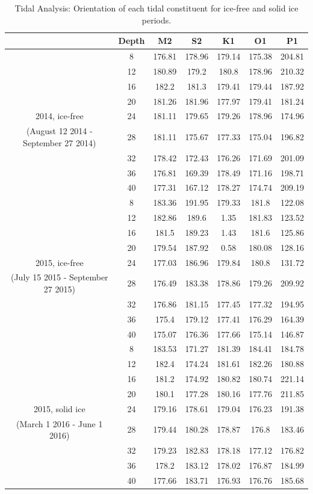 \documentclass[12pt]{dforeport}
\begin{document}
\begin{table}[ht]
\centering
\caption[Orientation of Tidal Constituents]{Tidal Analysis: Orientation of each tidal constituent for ice-free and solid ice periods.} 
\label{t:orien}
\begin{tabular}{| c | c | c c c c c |}
\hline
& Depth & M2 & S2 & K1 & O1 & P1 \\
\hline
& 8 & 176.81 & 178.96 & 179.14 & 175.38 & 204.81 \\
& 12 & 180.89 & 179.2 & 180.8 & 178.96 & 210.32 \\
& 16 & 182.2 & 181.3 & 179.41 & 179.44 & 187.92 \\
& 20 & 181.26 & 181.96 & 177.97 & 179.41 & 181.24 \\
2014, ice-free & 24 & 181.11 & 179.65 & 179.26 & 178.96 & 174.96 \\
(August 12 2014 - September 27 2014) & 28 & 181.11 & 175.67 & 177.33 & 175.04 & 196.82 \\
& 32 & 178.42 & 172.43 & 176.26 & 171.69 & 201.09 \\
& 36 & 176.81 & 169.39 & 178.49 & 171.16 & 198.71 \\
& 40 & 177.31 & 167.12 & 178.27 & 174.74 & 209.19 \\
 \hline
& 8 & 183.36 & 191.95 & 179.33 & 181.8 & 122.08 \\
& 12 & 182.86 & 189.6 & 1.35 & 181.83 & 123.52 \\
& 16 & 181.5 & 189.23 & 1.43 & 181.6 & 125.86 \\
& 20 & 179.54 & 187.92 & 0.58 & 180.08 & 128.16 \\
2015, ice-free & 24 & 177.03 & 186.96 & 179.84 & 180.8 & 131.72 \\
(July 15 2015 - September 27 2015) & 28 & 176.49 & 183.38 & 178.86 & 179.26 & 209.92 \\
& 32 & 176.86 & 181.15 & 177.45 & 177.32 & 194.95 \\
& 36 & 175.4 & 179.12 & 177.41 & 176.29 & 164.39 \\
& 40 & 175.07 & 176.36 & 177.66 & 175.14 & 146.87 \\
 \hline
& 8 & 183.53 & 171.27 & 181.39 & 184.41 & 184.78 \\
& 12 & 182.4 & 174.24 & 181.61 & 182.26 & 180.88 \\
& 16 & 181.2 & 174.92 & 180.82 & 180.74 & 221.14 \\
& 20 & 180.1 & 177.28 & 180.16 & 177.76 & 211.85 \\
2015, solid ice & 24 & 179.16 & 178.61 & 179.04 & 176.23 & 191.38 \\
(March 1 2016 - June 1 2016) & 28 & 179.44 & 180.28 & 178.87 & 176.8 & 183.46 \\
& 32 & 179.23 & 182.83 & 178.18 & 177.12 & 176.82 \\
& 36 & 178.2 & 183.12 & 178.02 & 176.87 & 184.99 \\
& 40 & 177.66 & 183.71 & 176.93 & 176.76 & 185.68 \\
 \hline
\end{tabular}
\end{table}
\end{document}
